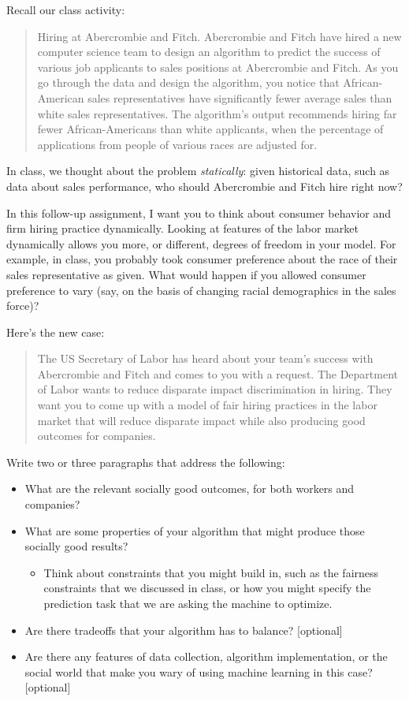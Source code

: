 \documentclass[submit]{harvardml}
\begin{document}
\newpage
\begin{problem}
Recall our class activity:
\begin{quote}
Hiring at Abercrombie and Fitch. Abercrombie and Fitch have hired a new computer science team to design an algorithm to predict the success of various job applicants to sales positions at Abercrombie and Fitch. As you go through the data and design the algorithm, you notice that African-American sales representatives have significantly fewer average sales than white sales representatives. The algorithm's output recommends hiring far fewer African-Americans than white applicants, when the percentage of applications from people of various races are adjusted for.
\end{quote}

In class, we thought about the problem \textit{statically}: given historical data, such as data about sales performance, who should Abercrombie and Fitch hire right now?

In this follow-up assignment, I want you to think about consumer behavior and firm hiring practice dynamically. Looking at features of the labor market dynamically allows you more, or different, degrees of freedom in your model. For example, in class, you probably took consumer preference about the race of their sales representative as given. What would happen if you allowed consumer preference to vary (say, on the basis of changing racial demographics in the sales force)?

Here’s the new case:
\begin{quote}
The US Secretary of Labor has heard about your team's success with Abercrombie and Fitch and comes to you with a request. The Department of Labor wants to reduce disparate impact discrimination in hiring. They want you to come up with a model of fair hiring practices in the labor market that will reduce disparate impact while also producing good outcomes for companies.
\end{quote}
Write two or three paragraphs that address the following:
\begin{itemize}
\item What are the relevant socially good outcomes, for both workers and companies?
\item What are some properties of your algorithm that might produce those socially good results?
\begin{itemize}
\item Think about constraints that you might build in, such as the fairness constraints that we discussed in class, or how you might specify the prediction task that we are asking the machine to optimize.
\end{itemize}
\item Are there tradeoffs that your algorithm has to balance? [optional]
\item Are there any features of data collection, algorithm implementation, or the social world that make you wary of using machine learning in this case? [optional]
\end{itemize}


\end{problem}
\end{document}
